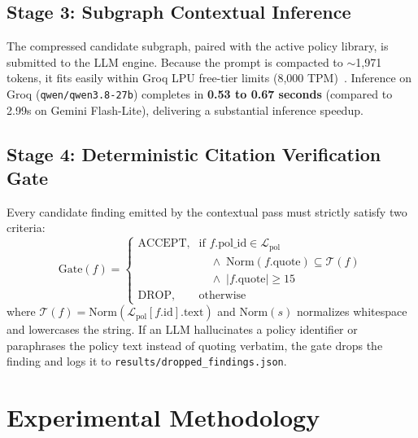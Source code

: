 \documentclass[conference]{IEEEtran}
\begin{document}
\subsection{Stage 3: Subgraph Contextual Inference}
The compressed candidate subgraph, paired with the active policy library, is submitted to the LLM engine. Because the prompt is compacted to $\sim$1,971 tokens, it fits easily within Groq LPU free-tier limits (8,000 TPM)~\cite{groq_lpu}. Inference on Groq (\texttt{qwen/qwen3.8-27b}) completes in \textbf{0.53 to 0.67 seconds} (compared to 2.99s on Gemini Flash-Lite), delivering a substantial inference speedup.

\subsection{Stage 4: Deterministic Citation Verification Gate}
Every candidate finding emitted by the contextual pass must strictly satisfy two criteria:
\begin{equation}
\text{Gate}(f) = 
\begin{cases} 
\text{ACCEPT}, & \text{if } f.\text{pol\_id} \in \mathcal{L}_{\text{pol}} \\
&\quad \land\; \text{Norm}(f.\text{quote}) \subseteq \mathcal{T}(f) \\
&\quad \land\; |f.\text{quote}| \ge 15 \\ 
\text{DROP}, & \text{otherwise} 
\end{cases}
\end{equation}
where $\mathcal{T}(f) = \text{Norm}(\mathcal{L}_{\text{pol}}[f.\text{id}].\text{text})$ and $\text{Norm}(s)$ normalizes whitespace and lowercases the string. If an LLM hallucinates a policy identifier or paraphrases the policy text instead of quoting verbatim, the gate drops the finding and logs it to \texttt{results/dropped\_findings.json}.

\section{Experimental Methodology}
\end{document}
